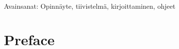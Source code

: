 \documentclass[final]{thesis} %
\begin{document}
\bigskip

\begin{otherlanguage}{finnish}


\begin{comment}
\noindent Heti opinnäytteen nimiölehden jälkeen sijoitettava tiivistelmä on yhdelle paperille mahtuva ja tavallisesti enintään 250 sanaa sisältävä yhteenveto, joka hyvin tiiviissä muodossa informoi kirjoituksesta. On tärkeää, että tiivistelmä laaditaan huolellisesti, koska sen välityksellä tieto kirjoituksesta leviää eri tietokantojen kautta. Sen tulee olla laadittu niin, että se sellaisenaan voidaan julkaista tietokannoissa. Tiivistelmään alkuun on merkittävä opinnäytteen bibliografiset tiedot ja sen lopussa mainitaan sitä kuvaavat avainsanat. Tiivistelmiä on kahta tyyppiä. Informatiivinen tiivistelmä on tärkein. Se kertoo, mitä ja miten on tutkittu ja mitkä ovat tulokset. Indikatiivinen tiivistelmä osoittaa, mitä kirjoituksessa on käsitelty. Se on sisällöltään yleisempi kuin informatiivinen tiivistelmä, eikä se kerro tuloksista. Tiivistelmän loppuun liitetään aihetta kuvaavat 3--5 avainsanaa helpottamaan tietokantajärjestelmien työtä. Avainsanat voidaan antaa vapaasti asiasisällön mukaan tai poimia termit alan kontrolloiduista sanastoista kuten Yleisestä suomalaisesta asiasanastosta YSA. Opinnäytteen tunnistamiseksi tarvittavat bibliografiset tiedot annetaan tiivistelmän alussa. Tarvittavat tiedot ovat kirjoittajan suku- ja etunimi, opinnäytteen otsikko, opinnäytteen tyyppi, ainelaitoksen nimi, yliopiston nimi, valmistumisvuosi ja työn sivujen lukumäärä (ilman liitesivuja).
\end{comment}
\end{otherlanguage}

\bigskip

\noindent Avainsanat: Opinnäyte, tiivistelmä, kirjoittaminen, ohjeet

\section*{Preface}

\begin{comment}

Esipuheen teksti tulee tähän. \lipsum[1]

\end{comment}
\end{document}
